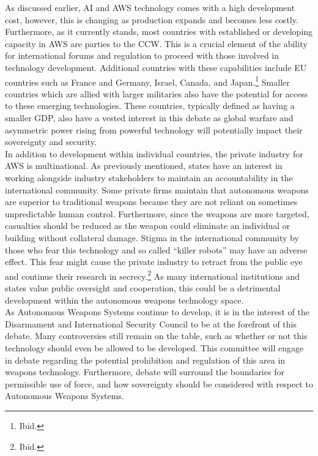 \documentclass[10pt, letterpaper]{article}
\begin{document}
 As discussed earlier, AI and AWS technology comes with a high
development cost, however, this is changing as production expands and
becomes less costly. Furthermore, as it currently stands, most countries
with established or developing capacity in AWS are parties to the CCW.
This is a crucial element of the ability for international forums and
regulation to proceed with those involved in technology development.
Additional countries with these capabilities include EU countries such
as France and Germany, Israel, Canada, and Japan.\footnote{Ibid.}
Smaller countries which are allied with larger militaries also have the
potential for access to these emerging technologies. These countries,
typically defined as having a smaller GDP, also have a vested interest
in this debate as global warfare and asymmetric power rising from
powerful technology will potentially impact their sovereignty and
security. \\

 In addition to development within individual countries, the
private industry for AWS is multinational. As previously mentioned,
states have an interest in working alongside industry stakeholders to
maintain an accountability in the international community. Some private
firms maintain that autonomous weapons are superior to traditional
weapons because they are not reliant on sometimes unpredictable human
control. Furthermore, since the weapons are more targeted, casualties
should be reduced as the weapon could eliminate an individual or
building without collateral damage. Stigma in the international
community by those who fear this technology and so called ``killer
robots'' may have an adverse effect. This fear might cause the private
industry to retract from the public eye and continue their research in
secrecy.\footnote{Ibid.} As many international institutions and states
value public oversight and cooperation, this could be a detrimental
development within the autonomous weapons technology space. \\

 As Autonomous Weapons Systems continue to develop, it is in the
interest of the Disarmament and International Security Council to be at
the forefront of this debate. Many controversies still remain on the
table, such as whether or not this technology should even be allowed to
be developed. This committee will engage in debate regarding the
potential prohibition and regulation of this area in weapons technology.
Furthermore, debate will surround the boundaries for permissible use of
force, and how sovereignty should be considered with respect to
Autonomous Weapons Systems. \\
\end{document}
